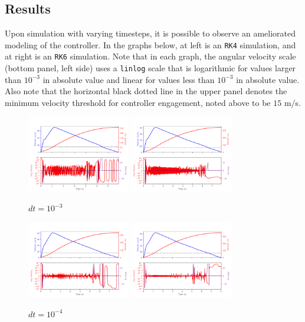 \documentclass{amsdtx}
\begin{document}
\subsection{Results}
Upon simulation with varying timesteps, it is possible to observe an ameliorated modeling of the controller. In the graphs below, at left is an \verb|RK4| simulation, and at right is an \verb|RK6| simulation. Note that in each graph, the angular velocity scale (bottom panel, left side) uses a \verb|linlog| scale that is logarithmic for values larger than $10^{-3}$ in absolute value and linear for values less than $10^{-3}$ in absolute value. Also note that the horizontal black dotted line in the upper panel denotes the minimum velocity threshold for controller engagement, noted above to be $15$ m/s.
\begin{figure}[H]
\centering
\includegraphics[width=0.4\textwidth]{bib/figures_for_readme/RK4_dt_0p001.pdf}
\includegraphics[width=0.4\textwidth]{bib/figures_for_readme/RK6_dt_0p001.pdf}
\caption{$dt=10^{-3}$}
\end{figure}
\begin{figure}[H]
\centering
\includegraphics[width=0.4\textwidth]{bib/figures_for_readme/RK4_dt_0p0001.pdf}
\includegraphics[width=0.4\textwidth]{bib/figures_for_readme/RK6_dt_0p0001.pdf}
\caption{$dt=10^{-4}$}
\end{figure}
\end{document}
